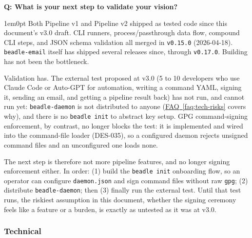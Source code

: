 \documentclass[11pt,letterpaper]{article}
\newcounter{faqnum}
\newenvironment{faqpair}[1]{%
  \needspace{4\baselineskip}%
  \vspace{0.5em}%
  \refstepcounter{faqnum}%
  \noindent\textbf{\color{SectionBlue}Q\thefaqnum: #1}\par\nopagebreak[4]%
  \vspace{0.2em}%
  \begin{adjustwidth}{1em}{0pt}%
  \setlength{\parindent}{0pt}%
}{%
  \end{adjustwidth}%
  \vspace{0.5em}%
}
\newcommand{\faqref}[1]{\hyperref[#1]{FAQ~\ref*{#1}}}
\begin{document}
\begin{faqpair}{What is your next step to validate your vision?}\label{faq:next-step}
  Both Pipeline v1 and Pipeline v2 shipped as tested code since this
  document's v3.0 draft. CLI runners, process/passthrough data flow,
  compound CLI steps, and JSON schema validation all merged in
  \texttt{v0.15.0} (2026-04-18). \texttt{beadle-email} itself has shipped
  several releases since, through \texttt{v0.17.0}. Building has not been
  the bottleneck.

  Validation has. The external test proposed at v3.0 (5 to 10 developers
  who use Claude Code or Auto-GPT for automation, writing a command YAML,
  signing it, sending an email, and getting a pipeline result back) has
  not run, and cannot run yet: \texttt{beadle-daemon} is not distributed to
  anyone (\faqref{faq:tech-risks} covers why), and there is no
  {\small\texttt{beadle init}} to abstract key setup. GPG command-signing
  enforcement, by contrast, no longer blocks the test: it is implemented and
  wired into the command-file loader (DES-035), so a configured daemon
  rejects unsigned command files and an unconfigured one loads none.

  The next step is therefore not more pipeline features, and no longer
  signing enforcement either. In order: (1) build the
  {\small\texttt{beadle init}} onboarding flow, so an operator can configure
  {\small\texttt{daemon.json}} and sign command files without raw
  \texttt{gpg}; (2) distribute \texttt{beadle-daemon}; then (3) finally run
  the external test. Until that test runs, the riskiest assumption in this
  document, whether the signing ceremony feels like a feature or a burden,
  is exactly as untested as it was at v3.0.
\end{faqpair}

\subsubsection*{Technical}
\end{document}
